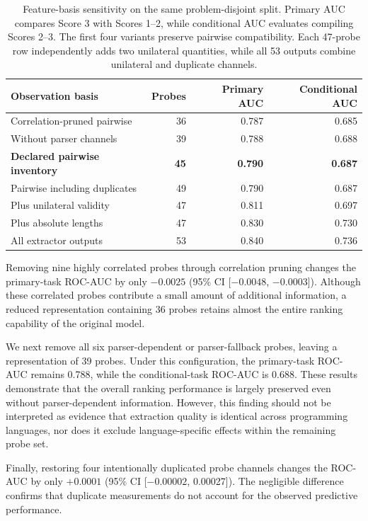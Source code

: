 \documentclass[conference]{IEEEtran}
\begin{document}
\begin{table}[!t]
\centering
\caption{Feature-basis sensitivity on the same problem-disjoint split. Primary AUC compares Score 3 with Scores 1--2, while conditional AUC evaluates compiling Scores 2--3. The first four variants preserve pairwise compatibility. Each 47-probe row independently adds two unilateral quantities, while all 53 outputs combine unilateral and duplicate channels.}
\label{tab:feature-basis}
\footnotesize
\setlength{\tabcolsep}{3.4pt}
\begin{tabular}{@{}lrrr@{}}
\toprule
Observation basis & Probes & Primary AUC & Conditional AUC \\
\midrule
Correlation-pruned pairwise & 36 & 0.787 & 0.685 \\
Without parser channels & 39 & 0.788 & 0.688 \\
\textbf{Declared pairwise inventory} & \textbf{45} & \textbf{0.790} & \textbf{0.687} \\
Pairwise including duplicates & 49 & 0.790 & 0.687 \\
Plus unilateral validity & 47 & 0.811 & 0.697 \\
Plus absolute lengths & 47 & 0.830 & 0.730 \\
All extractor outputs & 53 & 0.840 & 0.736 \\
\bottomrule
\end{tabular}
\end{table}

Removing nine highly correlated probes through correlation pruning changes the primary-task ROC-AUC by only $-0.0025$ (95\% CI [${-0.0048}$, ${-0.0003}$]). Although these correlated probes contribute a small amount of additional information, a reduced representation containing 36 probes retains almost the entire ranking capability of the original model.

We next remove all six parser-dependent or parser-fallback probes, leaving a representation of 39 probes. Under this configuration, the primary-task ROC-AUC remains 0.788, while the conditional-task ROC-AUC is 0.688. These results demonstrate that the overall ranking performance is largely preserved even without parser-dependent information. However, this finding should not be interpreted as evidence that extraction quality is identical across programming languages, nor does it exclude language-specific effects within the remaining probe set.

Finally, restoring four intentionally duplicated probe channels changes the ROC-AUC by only $+0.0001$ (95\% CI [${-0.00002}$, 0.00027]). The negligible difference confirms that duplicate measurements do not account for the observed predictive performance.
\end{document}
